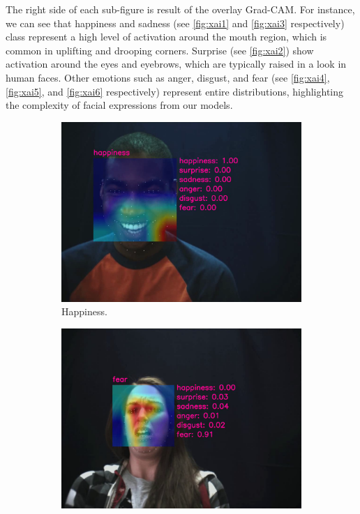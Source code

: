 The right side of each sub-figure is result of the overlay Grad-CAM. 
For instance, 
we can see that happiness and sadness (see \cref{fig:xai1} and \cref{fig:xai3} respectively) 
class represent a high level of activation around the mouth region, 
which is common in uplifting and drooping corners. 
Surprise (see \cref{fig:xai2}) show activation around the eyes and eyebrows, which are typically raised in a look in human faces. 
Other emotions such as anger, disgust, and fear (see \cref{fig:xai4}, \cref{fig:xai5}, and \cref{fig:xai6} respectively) 
represent entire distributions, highlighting the complexity of facial expressions from our models.

\begin{figure}[ht]
  \centering
  \begin{subfigure}{0.49\linewidth} %
    \includegraphics[width=\linewidth]{GiMeFive01.png}
    \caption{Happiness.}
    \label{fig:v1}
  \end{subfigure}
  \hfill
  \begin{subfigure}{0.49\linewidth}
    \includegraphics[width=\linewidth]{GiMeFive02.png}

\end{subfigure}
\end{figure}
